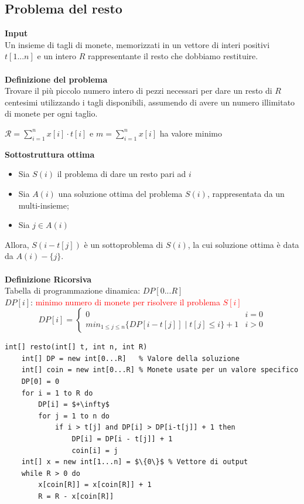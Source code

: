 \documentclass[../cheatSheetAlgoritmi.tex]{subfiles}
\begin{document}
\subsection{Problema del resto}
\textbf{Input}\\
Un insieme di tagli di monete, memorizzati in un vettore di interi positivi $t[1...n]$ e un intero $R$ rappresentante il resto che dobbiamo restituire.\\\\
\textbf{Definizione del problema}\\
Trovare il più piccolo numero intero di pezzi necessari per dare un resto di $R$ centesimi utilizzando i tagli disponibili, assumendo di avere un numero illimitato di monete per ogni taglio.
\begin{center}
	$\mathcal{R} = \sum_{i=1}^{n} x[i] \cdot t[i]$ e $m = \sum_{i = 1}^{n} x[i]$ ha valore minimo
\end{center}
\textbf{Sottostruttura ottima}
\begin{itemize}
	\item Sia $S(i)$ il problema di dare un resto pari ad $i$
	\item Sia $A(i)$ una soluzione ottima del problema $S(i)$, rappresentata da un multi-insieme; 
	\item Sia $j \in A(i)$
\end{itemize}
Allora, $S(i - t[j])$ è un sottoproblema di $S(i)$, la cui soluzione ottima è data da $A(i) - \{j\}$.\\\\
\textbf{Definizione Ricorsiva}\\
Tabella di programmazione dinamica: $DP[0...R]$\\
$DP[i]$: \textcolor{red}{minimo numero di monete per risolvere il problema $S[i]$}\\
\begin{equation*}
  	DP[i]=\begin{cases}
   		0  & \text{$i = 0$}\\
   		min_{1 \leq j \leq n}\{DP[i - t[j]] \mid t[j] \leq i\} + 1 & \text{$i > 0$}
  	\end{cases}
\end{equation*}
\begin{lstlisting}[caption=Resto (DP)]
int[] resto(int[] t, int n, int R)
	int[] DP = new int[0...R] 	% Valore della soluzione
	int[] coin = new int[0...R]	% Monete usate per un valore specifico
	DP[0] = 0
	for i = 1 to R do
		DP[i] = $+\infty$
		for j = 1 to n do
			if i > t[j] and DP[i] > DP[i-t[j]] + 1 then
				DP[i] = DP[i - t[j]] + 1
				coin[i] = j
	int[] x = new int[1...n] = $\{0\}$ % Vettore di output
	while R > 0 do
		x[coin[R]] = x[coin[R]] + 1
		R = R - x[coin[R]]
\end{lstlisting}
\end{document}
